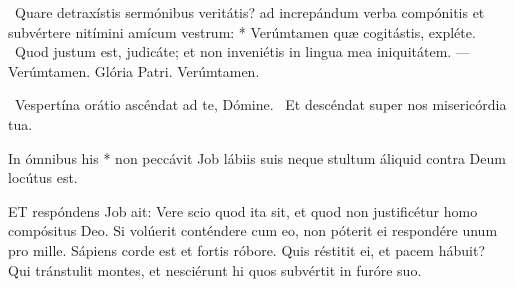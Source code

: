\R\ Quare detraxístis sermónibus veritátis? ad increpándum verba compónitis et subvértere nitímini amícum vestrum: * Verúmtamen quæ cogitástis, expléte. \V\ Quod justum est, judicáte; et non inveniétis in lingua mea iniquitátem. — Verúmtamen. Glória Patri. Verúmtamen.


\V\ Vespertína orátio ascéndat ad te, Dómine. \R\ Et descéndat super nos misericórdia tua.

 In ómnibus his * non peccávit Job lábiis suis neque stultum áliquid contra Deum locútus est.







\lettrine[lines=2]{E}{T} respóndens Job ait: Vere scio quod ita sit, et quod non justificétur homo compósitus Deo. Si volúerit conténdere cum eo, non póterit ei respondére unum pro mille. Sápiens corde est et fortis róbore. Quis réstitit ei, et pacem hábuit? Qui tránstulit montes, et nesciérunt hi quos subvértit in furóre suo.

